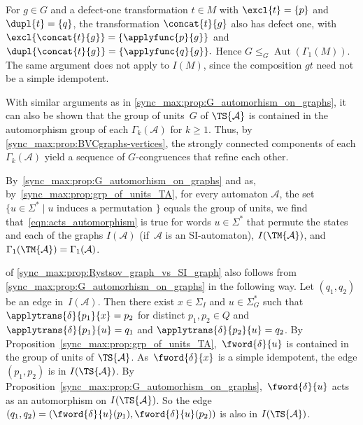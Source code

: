 \begin{remark}
	For $g \in G$ and a defect-one transformation $t \in M$
	with $\excl{t} = \{p\}$ and $\dupl{t} = \{q\}$,
	the transformation $\concat{t}{g}$ also has defect one, with
	$
	\excl{\concat{t}{g}} = \{\applyfunc{p}{g}\}
	$
	and
	$
	\dupl{\concat{t}{g}} = \{\applyfunc{q}{g}\}.
	$
	Hence
	$
	G \le_G \operatorname{Aut}(\Gamma_1(M)).
	$
	The same argument does not apply to $I(M)$, since the composition
	$gt$ need not be a simple idempotent.
\end{remark}

\begin{remark}
	With similar arguments as in \cref{sync_max:prop:G_automorhism_on_graphs}, 
	it can also be shown that the group of units~$G$ of $\TS{\mathcal A}$
	is contained in the automorphism group of each $\Gamma_k(\mathcal A)$
	for $k \ge 1$.
	Thus, by \cref{sync_max:prop:BVCgraphs-vertices},
	the strongly connected components of each $\Gamma_k(\mathcal A)$
	yield a sequence of $G$-congruences that refine each other.
\end{remark}

\begin{remark}
	By~\cref{sync_max:prop:G_automorhism_on_graphs}
	and as, by~\cref{sync_max:prop:grp_of_units_TA}, for every automaton $\mathcal A$, the set
	$\{ u \in \Sigma^* \mid \text{$u$ induces a permutation } \}$
	equals the group of units,
	we find that~\cref{eqn:acts_automorphism}
	is true for words $u \in \Sigma^*$
	that permute the states and each of the graphs $I(\mathcal A)$ (if~$\mathcal A$ is an SI-automaton), $I(\TM{\mathcal A})$, and $\Gamma_1(\TM{\mathcal A}) = \Gamma_1(\mathcal A)$.	
\end{remark}

\begin{remark}
	 of \cref{sync_max:prop:Rystsov_graph_vs_SI_graph} 
	also follows from \cref{sync_max:prop:G_automorhism_on_graphs}
	in the following way.
	Let $(q_1,q_2)$ be an edge in~$I(\mathcal A)$.
	Then there exist $x \in \Sigma_I$ and $u \in \Sigma_G^*$ such that $\applytrans{\delta}{p_1}{x} = p_2$
	for distinct $p_1, p_2 \in Q$ and $\applytrans{\delta}{p_1}{u} = q_1$
	and $\applytrans{\delta}{p_2}{u} = q_2$.		
	By Proposition~\ref{sync_max:prop:grp_of_units_TA},~$\fword{\delta}{u}$ is contained in the group of units of $\TS{\mathcal A}$.
	As~$\fword{\delta}{x}$ is a simple idempotent, the edge $(p_1, p_2)$ is in $I(\TS{\mathcal A})$.
	By Proposition~\ref{sync_max:prop:G_automorhism_on_graphs},~$\fword{\delta}{u}$ acts as an automorphism on $I(\TS{\mathcal A})$.
	So the edge $(q_1, q_2) = (\fword{\delta}{u}(p_1), \fword{\delta}{u}(p_2))$
	is also in $I(\TS{\mathcal A})$.
\end{remark}

